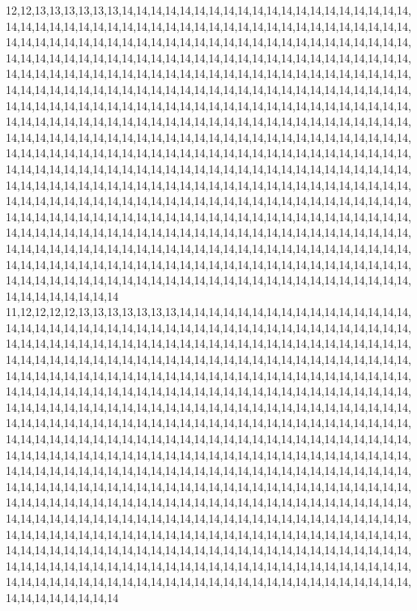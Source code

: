 12,12,13,13,13,13,13,13,14,14,14,14,14,14,14,14,14,14,14,14,14,14,14,14,14,14,14,14,14,14,14,14,14,14,14,14,14,14,14,14,14,14,14,14,14,14,14,14,14,14,14,14,14,14,14,14,14,14,14,14,14,14,14,14,14,14,14,14,14,14,14,14,14,14,14,14,14,14,14,14,14,14,14,14,14,14,14,14,14,14,14,14,14,14,14,14,14,14,14,14,14,14,14,14,14,14,14,14,14,14,14,14,14,14,14,14,14,14,14,14,14,14,14,14,14,14,14,14,14,14,14,14,14,14,14,14,14,14,14,14,14,14,14,14,14,14,14,14,14,14,14,14,14,14,14,14,14,14,14,14,14,14,14,14,14,14,14,14,14,14,14,14,14,14,14,14,14,14,14,14,14,14,14,14,14,14,14,14,14,14,14,14,14,14,14,14,14,14,14,14,14,14,14,14,14,14,14,14,14,14,14,14,14,14,14,14,14,14,14,14,14,14,14,14,14,14,14,14,14,14,14,14,14,14,14,14,14,14,14,14,14,14,14,14,14,14,14,14,14,14,14,14,14,14,14,14,14,14,14,14,14,14,14,14,14,14,14,14,14,14,14,14,14,14,14,14,14,14,14,14,14,14,14,14,14,14,14,14,14,14,14,14,14,14,14,14,14,14,14,14,14,14,14,14,14,14,14,14,14,14,14,14,14,14,14,14,14,14,14,14,14,14,14,14,14,14,14,14,14,14,14,14,14,14,14,14,14,14,14,14,14,14,14,14,14,14,14,14,14,14,14,14,14,14,14,14,14,14,14,14,14,14,14,14,14,14,14,14,14,14,14,14,14,14,14,14,14,14,14,14,14,14,14,14,14,14,14,14,14,14,14,14,14,14,14,14,14,14,14,14,14,14,14,14,14,14,14,14,14,14,14,14,14,14,14,14,14,14,14,14,14,14,14,14,14,14,14,14,14,14,14,14,14,14,14,14,14,14,14,14,14,14,14,14,14,14,14,14,14,14,14,14,14,14,14,14,14,14,14,14,14,14,14,14,14,14,14,14,14,14,14,14,14,14,14,14,14,14,14,14,14,14,14,14,14,14,14,14,14,14,14,14,14,14,14,14,14,14,14,14,14,14,14,14,14,14,14,14,14,14,14,14
11,12,12,12,12,13,13,13,13,13,13,13,14,14,14,14,14,14,14,14,14,14,14,14,14,14,14,14,14,14,14,14,14,14,14,14,14,14,14,14,14,14,14,14,14,14,14,14,14,14,14,14,14,14,14,14,14,14,14,14,14,14,14,14,14,14,14,14,14,14,14,14,14,14,14,14,14,14,14,14,14,14,14,14,14,14,14,14,14,14,14,14,14,14,14,14,14,14,14,14,14,14,14,14,14,14,14,14,14,14,14,14,14,14,14,14,14,14,14,14,14,14,14,14,14,14,14,14,14,14,14,14,14,14,14,14,14,14,14,14,14,14,14,14,14,14,14,14,14,14,14,14,14,14,14,14,14,14,14,14,14,14,14,14,14,14,14,14,14,14,14,14,14,14,14,14,14,14,14,14,14,14,14,14,14,14,14,14,14,14,14,14,14,14,14,14,14,14,14,14,14,14,14,14,14,14,14,14,14,14,14,14,14,14,14,14,14,14,14,14,14,14,14,14,14,14,14,14,14,14,14,14,14,14,14,14,14,14,14,14,14,14,14,14,14,14,14,14,14,14,14,14,14,14,14,14,14,14,14,14,14,14,14,14,14,14,14,14,14,14,14,14,14,14,14,14,14,14,14,14,14,14,14,14,14,14,14,14,14,14,14,14,14,14,14,14,14,14,14,14,14,14,14,14,14,14,14,14,14,14,14,14,14,14,14,14,14,14,14,14,14,14,14,14,14,14,14,14,14,14,14,14,14,14,14,14,14,14,14,14,14,14,14,14,14,14,14,14,14,14,14,14,14,14,14,14,14,14,14,14,14,14,14,14,14,14,14,14,14,14,14,14,14,14,14,14,14,14,14,14,14,14,14,14,14,14,14,14,14,14,14,14,14,14,14,14,14,14,14,14,14,14,14,14,14,14,14,14,14,14,14,14,14,14,14,14,14,14,14,14,14,14,14,14,14,14,14,14,14,14,14,14,14,14,14,14,14,14,14,14,14,14,14,14,14,14,14,14,14,14,14,14,14,14,14,14,14,14,14,14,14,14,14,14,14,14,14,14,14,14,14,14,14,14,14,14,14,14,14,14,14,14,14,14,14,14,14,14,14,14,14,14,14,14,14,14,14,14,14,14,14,14,14,14,14,14,14,14,14,14,14,14
